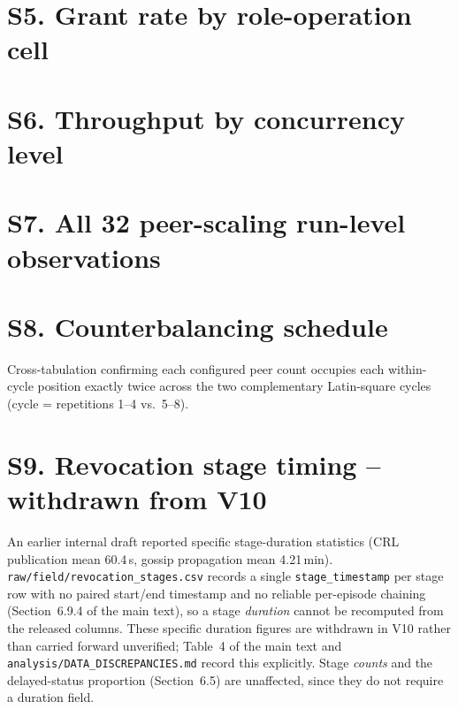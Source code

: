 \documentclass[11pt]{article}
\begin{document}
\section*{S5. Grant rate by role-operation cell}



\section*{S6. Throughput by concurrency level}



\section*{S7. All 32 peer-scaling run-level observations}



\section*{S8. Counterbalancing schedule}

Cross-tabulation confirming each configured peer count occupies each within-cycle position exactly twice across the two complementary Latin-square cycles (cycle = repetitions 1--4 vs.\ 5--8).

\begin{center}

\end{center}

\section*{S9. Revocation stage timing -- withdrawn from V10}

An earlier internal draft reported specific stage-duration statistics (CRL publication mean 60.4\,s, gossip propagation mean 4.21\,min). \texttt{raw/field/revocation\_stages.csv} records a single \texttt{stage\_timestamp} per stage row with no paired start/end timestamp and no reliable per-episode chaining (Section~6.9.4 of the main text), so a stage \emph{duration} cannot be recomputed from the released columns. These specific duration figures are withdrawn in V10 rather than carried forward unverified; Table~4 of the main text and \texttt{analysis/DATA\_DISCREPANCIES.md} record this explicitly. Stage \emph{counts} and the delayed-status proportion (Section~6.5) are unaffected, since they do not require a duration field.
\end{document}
